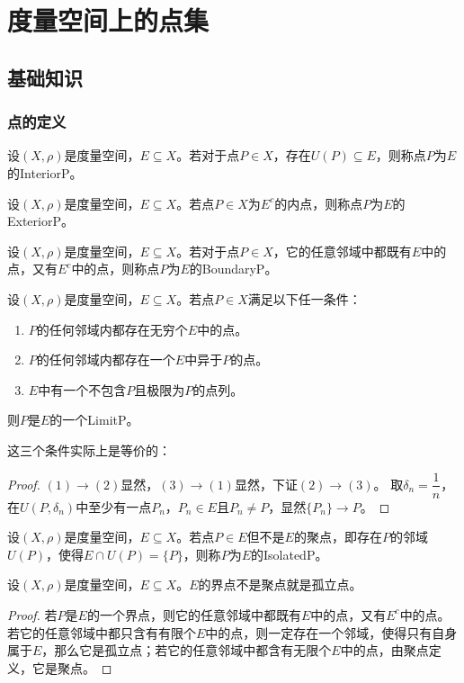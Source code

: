 \section{度量空间上的点集}
\subsection{基础知识}
\subsubsection{点的定义}
\begin{definition}
	设$(X,\rho)$是度量空间，$E\subseteq X$。若对于点$P\in X$，存在$U(P)\subseteq E$，则称点$P$为$E$的\gls{InteriorP}。
\end{definition}
\begin{definition}
	设$(X,\rho)$是度量空间，$E\subseteq X$。若点$P\in X$为$E^c$的内点，则称点$P$为$E$的\gls{ExteriorP}。
\end{definition}
\begin{definition}
	设$(X,\rho)$是度量空间，$E\subseteq X$。若对于点$P\in X$，它的任意邻域中都既有$E$中的点，又有$E^c$中的点，则称点$P$为$E$的\gls{BoundaryP}。
\end{definition}
\begin{definition}
	设$(X,\rho)$是度量空间，$E\subseteq X$。若点$P\in X$满足以下任一条件：
	\begin{enumerate}
		\item $P$的任何邻域内都存在无穷个$E$中的点。
		\item $P$的任何邻域内都存在一个$E$中异于$P$的点。
		\item $E$中有一个不包含$P$且极限为$P$的点列。
	\end{enumerate}
	则$P$是$E$的一个\gls{LimitP}。
\end{definition}
这三个条件实际上是等价的：
\begin{proof}
	$(1)\to(2)$显然，$(3)\to(1)$显然，下证$(2)\to(3)$。
	取$\delta_n=\dfrac{1}{n}$，在$U(P,\delta_n)$中至少有一点$P_n$，$P_n\in E$且$P_n\ne P$，显然$\{P_n\}\to P$。
\end{proof}
\begin{definition}
	设$(X,\rho)$是度量空间，$E\subseteq X$。若点$P\in E$但不是$E$的聚点，即存在$P$的邻域$U(P)$，使得$E\cap U(P)=\{P\}$，则称$P$为$E$的\gls{IsolatedP}。
\end{definition}
\begin{theorem}
	设$(X,\rho)$是度量空间，$E\subseteq X$。$E$的界点不是聚点就是孤立点。
\end{theorem}
\begin{proof}
	若$P$是$E$的一个界点，则它的任意邻域中都既有$E$中的点，又有$E^c$中的点。若它的任意邻域中都只含有有限个$E$中的点，则一定存在一个邻域，使得只有自身属于$E$，那么它是孤立点；若它的任意邻域中都含有无限个$E$中的点，由聚点定义，它是聚点。
\end{proof}
